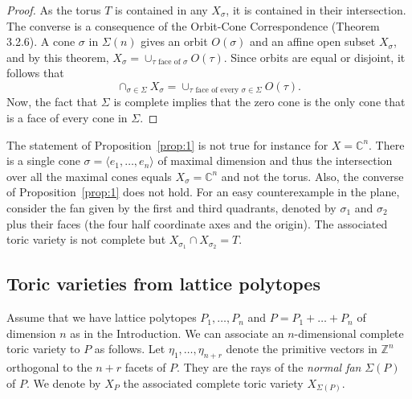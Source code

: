 \documentclass[a4paper,11pt]{amsart}
\newcommand{\Z}{\mathbb{Z}}
\numberwithin{thm}{section}
\numberwithin{equation}{section}
\theoremstyle{definition}
\theoremstyle{plain}
\begin{document}
\begin{proof} As the torus $T$ is contained in any $X_\sigma$, it is contained in their intersection.  The converse
 is a consequence of the Orbit-Cone Correspondence (Theorem 3.2.6). A cone $\sigma$ in $\Sigma(n)$ gives an orbit $O(\sigma)$ and an affine open subset $ X_\sigma$, and by this theorem,
$X_\sigma = \cup_{\tau \text{ face of } \sigma} O(\tau).$ Since orbits are equal or disjoint, it follows that 
\[\cap_{\sigma \in \Sigma} X_\sigma =  \cup_{\tau  \text{ face of every } \sigma \in \Sigma} O(\tau).\]
Now, the fact that $\Sigma$ is complete implies that the zero cone is the only cone that is a face of every cone in $\Sigma$.
\end{proof}

The statement of Proposition~\ref{prop:1} is not true for instance for $X = \mathbb C^n$. There is a single cone $\sigma = \langle e_1, \dots, e_n \rangle$  of maximal dimension and thus the intersection over all the maximal cones equals 
$X_\sigma = \mathbb{C}^n$  and not the torus. Also, the converse of Proposition~\ref{prop:1} does not hold.
 For an easy counterexample in the plane, consider the fan given by the first and third quadrants, denoted by $\sigma_1$ and $\sigma_2$ plus their faces (the four half coordinate axes and the origin).  The associated toric variety is not complete but $X_{\sigma_1} \cap X_{\sigma_2} = T$.
 


\subsection{Toric varieties from lattice polytopes}\label{ssec:vtp}
Assume that we have lattice polytopes $P_1,\ldots, P_n$ and $P = P_1 + \dots + P_n$ of dimension $n$ as in the Introduction. We can associate an $n$-dimensional complete toric variety to $P$ as follows.
Let $\eta_1,\ldots, \eta_{n+r}$ denote the primitive vectors in $\Z^n$ orthogonal to the $n+r$ facets of $P$. They are the rays of the {\em normal fan} $\Sigma(P)$ of $P$. We  denote by $X_P$ the associated 
complete toric variety $X_{\Sigma(P)}$.
\end{document}
